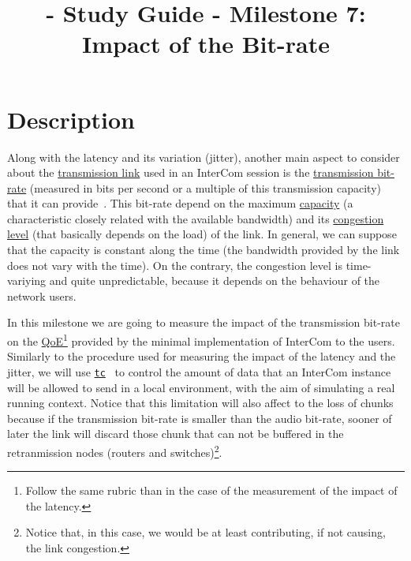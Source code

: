 
\title{\TM - Study Guide - Milestone 7: Impact of the Bit-rate}

\maketitle

\section{Description}

Along with the latency and its variation (jitter), another main aspect
to consider about the
\href{https://en.wikipedia.org/wiki/Telecommunications_link}{transmission
  link} used in an InterCom session is the
\href{https://en.wikipedia.org/wiki/Bit_rate}{transmission bit-rate}
(measured in bits per second or a multiple of this transmission
capacity) that it can provide~\cite{Forouzan,Tanenbaum}. This bit-rate
depend on the maximum
\href{https://en.wikipedia.org/wiki/Bandwidth_(computing)}{capacity}
(a characteristic closely related with the available bandwidth) and
its \href{https://en.wikipedia.org/wiki/Network_congestion}{congestion
  level} (that basically depends on the load) of the link. In general,
we can suppose that the capacity is constant along the time (the
bandwidth provided by the link does not vary with the time). On the
contrary, the congestion level is time-variying and quite
unpredictable, because it depends on the behaviour of the network
users.

In this milestone we are going to measure the impact of the
transmission bit-rate on the
\href{https://en.wikipedia.org/wiki/Quality_of_experience}{QoE}\footnote{Follow
  the same rubric than in the case of the measurement of the impact of
  the latency.} provided by the minimal implementation of InterCom to
the users. Similarly to the procedure used for measuring the impact of
the latency and the jitter, we will use
\href{https://man7.org/linux/man-pages/man8/tc.8.html}{\texttt{tc}}~\cite{bert2012lartc}
to control the amount of data that an InterCom instance will be
allowed to send in a local environment, with the aim of simulating a
real running context. Notice that this limitation will also affect to
the loss of chunks because if the transmission bit-rate is smaller
than the audio bit-rate, sooner of later the link will discard those
chunk that can not be buffered in the retranmission nodes (routers and
switches)\footnote{Notice that, in this case, we would be at least
  contributing, if not causing, the link congestion.}.


